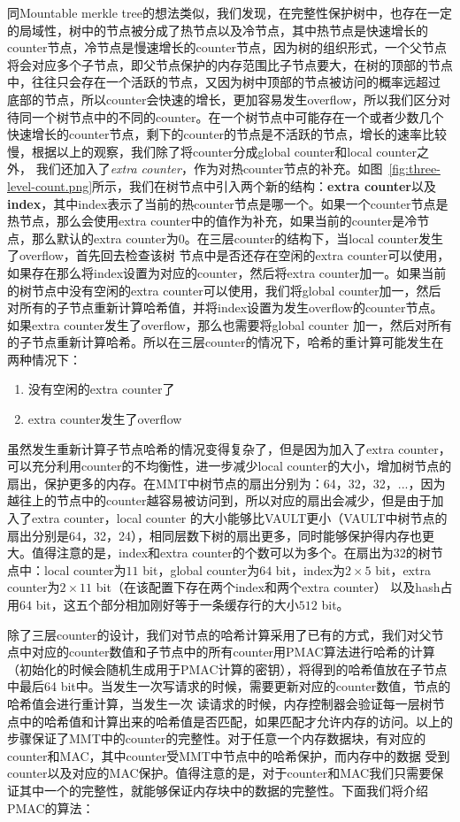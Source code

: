 同Mountable merkle tree的想法类似，我们发现，在完整性保护树中，也存在一定的局域性，树中的节点被分成了热节点以及冷节点，其中热节点是快速增长的counter节点，冷节点是慢速增长的counter节点，因为树的组织形式，一个父节点将会对应多个子节点，即父节点保护的内存范围比子节点要大，在树的顶部的节点中，往往只会存在一个活跃的节点，又因为树中顶部的节点被访问的概率远超过
底部的节点，所以counter会快速的增长，更加容易发生overflow，所以我们区分对待同一个树节点中的不同的counter。在一个树节点中可能存在一个或者少数几个快速增长的counter节点，剩下的counter的节点是不活跃的节点，增长的速率比较慢，根据以上的观察，我们除了将counter分成global counter和local counter之外，
我们还加入了\emph{extra counter}，作为对热counter节点的补充。如图~\ref{fig:three-level-count.png}所示，我们在树节点中引入两个新的结构：\textbf{extra counter}以及\textbf{index}，其中index表示了当前的热counter节点是哪一个。如果一个counter节点是热节点，那么会使用extra counter中的值作为补充，如果当前的counter是冷节点，那么默认的extra counter为0。在三层counter的结构下，当local counter发生了overflow，首先回去检查该树
节点中是否还存在空闲的extra counter可以使用，如果存在那么将index设置为对应的counter，然后将extra counter加一。如果当前的树节点中没有空闲的extra counter可以使用，我们将global counter加一，然后对所有的子节点重新计算哈希值，并将index设置为发生overflow的counter节点。
如果extra counter发生了overflow，那么也需要将global counter 加一，然后对所有的子节点重新计算哈希。所以在三层counter的情况下，哈希的重计算可能发生在两种情况下：
\begin{enumerate}
  \item 没有空闲的extra counter了
  \item extra counter发生了overflow
\end{enumerate}
虽然发生重新计算子节点哈希的情况变得复杂了，但是因为加入了extra counter，可以充分利用counter的不均衡性，进一步减少local counter的大小，增加树节点的扇出，保护更多的内存。在MMT中树节点的扇出分别为：64，32，32，...，因为越往上的节点中的counter越容易被访问到，所以对应的扇出会减少，但是由于加入了extra counter，local counter
的大小能够比VAULT更小（VAULT中树节点的扇出分别是64，32，24），相同层数下树的扇出更多，同时能够保护得内存也更大。值得注意的是，index和extra counter的个数可以为多个。在扇出为32的树节点中：local counter为$11$ bit，global counter为$64$ bit，index为$2\times5$ bit，extra counter为$2\times11$ bit（在该配置下存在两个index和两个extra counter）
以及hash占用$64$ bit，这五个部分相加刚好等于一条缓存行的大小$512$ bit。

除了三层counter的设计，我们对节点的哈希计算采用了已有的方式，我们对父节点中对应的counter数值和子节点中的所有counter用PMAC算法进行哈希的计算（初始化的时候会随机生成用于PMAC计算的密钥），将得到的哈希值放在子节点中最后64 bit中。当发生一次写请求的时候，需要更新对应的counter数值，节点的哈希值会进行重计算，当发生一次
读请求的时候，内存控制器会验证每一层树节点中的哈希值和计算出来的哈希值是否匹配，如果匹配才允许内存的访问。以上的步骤保证了MMT中的counter的完整性。对于任意一个内存数据块，有对应的counter和MAC，其中counter受MMT中节点中的哈希保护，而内存中的数据
受到counter以及对应的MAC保护。值得注意的是，对于counter和MAC我们只需要保证其中一个的完整性，就能够保证内存块中的数据的完整性。下面我们将介绍PMAC的算法：

